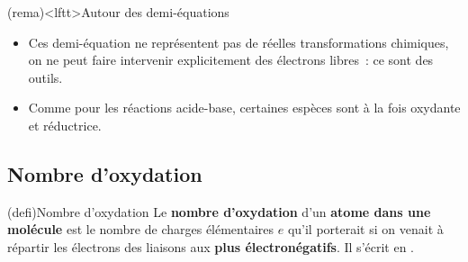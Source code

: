 \documentclass[../../main/main.tex]{subfiles}
\begin{document}
\begin{tcb*}(rema)<lftt>{Autour des demi-équations}
	\begin{itemize}
		\item Ces demi-équation ne représentent pas de réelles transformations
		      chimiques, on ne peut faire intervenir explicitement des électrons
		      libres~: ce sont des outils.
		\item Comme pour les réactions acide-base, certaines espèces sont à la fois
		      oxydante et réductrice.
	\end{itemize}
\end{tcb*}

\subsection{Nombre d'oxydation}

\begin{tcb*}(defi){Nombre d'oxydation}
	Le \textbf{nombre d'oxydation} d'un
	\textbf{atome dans une molécule} est le nombre de charges élémentaires $e$
	qu'il porterait si on venait à répartir les électrons des liaisons aux
	\textbf{plus électronégatifs}. Il s'écrit en .
\end{tcb*}
\end{document}
